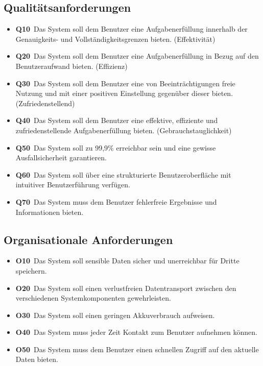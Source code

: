 \documentclass[a4paper,11pt]{article}%
\renewcommand{\\}{\vspace*{0.5\baselineskip} \newline}
\begin{document}
	\subsection{Qualitätsanforderungen}
		\begin{itemize}
			\item \lbrack \textbf{Q10}\rbrack \ Das System soll dem Benutzer eine Aufgabenerfüllung innerhalb der Genauigkeits- und Vollständigkeitsgrenzen bieten. (Effektivität)
			\item \lbrack \textbf{Q20}\rbrack \ Das System soll dem Benutzer eine Aufgabenerfüllung in Bezug auf den Benutzeraufwand bieten. (Effizienz)
			\item \lbrack \textbf{Q30}\rbrack \ Das System soll dem Benutzer eine von Beeinträchtigungen freie Nutzung und mit einer positiven Einstellung gegenüber dieser bieten. (Zufriedenstellend)
			\item \lbrack \textbf{Q40}\rbrack \ Das System soll dem Benutzer eine effektive, effiziente und zufriedenstellende Aufgabenerfüllung bieten. (Gebrauchstauglichkeit)
			\item \lbrack \textbf{Q50}\rbrack \ Das System soll zu 99,9\% erreichbar sein und eine gewisse Ausfallsicherheit garantieren.
			\item \lbrack \textbf{Q60}\rbrack \ Das System soll über eine strukturierte Benutzeroberfläche mit intuitiver Benutzerführung verfügen.
			\item \lbrack \textbf{Q70}\rbrack \ Das System muss dem Benutzer fehlerfreie Ergebnisse und Informationen bieten.
		\end{itemize}
	\subsection{Organisationale Anforderungen}
		\begin{itemize}
			\item \lbrack \textbf{O10}\rbrack \ Das System soll sensible Daten sicher und unerreichbar für Dritte speichern.
			\item \lbrack \textbf{O20}\rbrack \ Das System soll einen verlustfreien Datentransport zwischen den verschiedenen Systemkomponenten gewehrleisten.  
			\item \lbrack \textbf{O30}\rbrack \ Das System soll einen geringen Akkuverbrauch aufweisen.
			\item \lbrack \textbf{O40}\rbrack \ Das System muss jeder Zeit Kontakt zum Benutzer aufnehmen können.
			\item \lbrack \textbf{O50}\rbrack \ Das System muss dem Benutzer einen schnellen Zugriff auf den aktuelle Daten bieten.  
		\end{itemize}
\newpage
\appendix
\end{document}
